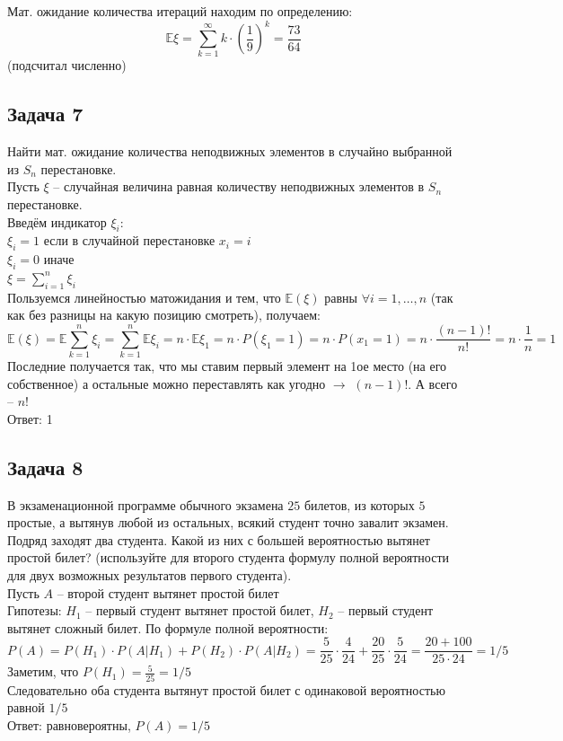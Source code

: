\documentclass[a4paper,12pt]{article} %
\begin{document}
Мат. ожидание количества итераций находим по определению:
$$
\mathbb{E}\xi = \sum\limits_{k=1}^{\infty} k \cdot \left(\frac{1}{9}\right)^k = \frac{73}{64}
$$
(подсчитал численно)

\subsection*{Задача 7}
Найти мат. ожидание количества неподвижных элементов в случайно выбранной из $S_n$ перестановке.  \smallskip \\

Пусть $ \xi $ -- случайная величина равная количеству неподвижных элементов в $S_n$ перестановке.\\
Введём индикатор $ \xi_i $:\\
$ \xi_i = 1 $ если в случайной перестановке $ x_i = i $\\
$ \xi_i = 0 $ иначе\\
$ \xi = \sum\limits_{i=1}^{n} \xi_i$\\
Пользуемся линейностью матожидания и тем, что $ \mathbb{E}(\xi) $ равны $\forall i = 1, \ldots, n$ (так как без разницы на какую позицию смотреть), получаем:
$$\mathbb{E}(\xi) = \mathbb{E}\sum\limits_{k=1}^{n} \xi_i = \sum\limits_{k=1}^{n}\mathbb{E} \xi_i = n \cdot \mathbb{E} \xi_1 = n \cdot P(\xi_1 = 1) = n \cdot P(x_1 = 1) = n \cdot \frac{(n-1)!}{n!} = n \cdot \frac{1}{n} = 1$$
Последние получается так, что мы ставим первый элемент на 1ое место (на его собственное) а остальные можно переставлять как угодно $ \longrightarrow $ $ (n-1)! $. А всего -- $ n! $\\
Ответ: 1

\subsection*{Задача 8}
В экзаменационной программе обычного экзамена $25$ билетов, из которых $5$ простые, а вытянув любой из остальных, всякий студент точно завалит экзамен. Подряд заходят два студента. Какой из них с большей вероятностью вытянет простой билет? (используйте для второго студента формулу полной вероятности для двух возможных результатов первого студента). \smallskip \\

Пусть $ A $ -- второй студент вытянет простой билет\\
Гипотезы: $ H_1 $ -- первый студент вытянет простой билет, $ H_2 $ -- первый студент вытянет сложный билет. По формуле полной вероятности:\\
$$
P(A) = P(H_1) \cdot P(A | H_1) + P(H_2) \cdot P(A | H_2) = \frac{5}{25} \cdot \frac{4}{24} + \frac{20}{25} \cdot \frac{5}{24} = \frac{20+100}{25 \cdot 24} = 1/5
$$
Заметим, что $ P(H_1) = \frac{5}{25} = 1/5 $\\
Следовательно оба студента вытянут простой билет с одинаковой вероятностью равной $ 1/5 $\\
Ответ: равновероятны, $ P(A) = 1/5 $
\end{document}
